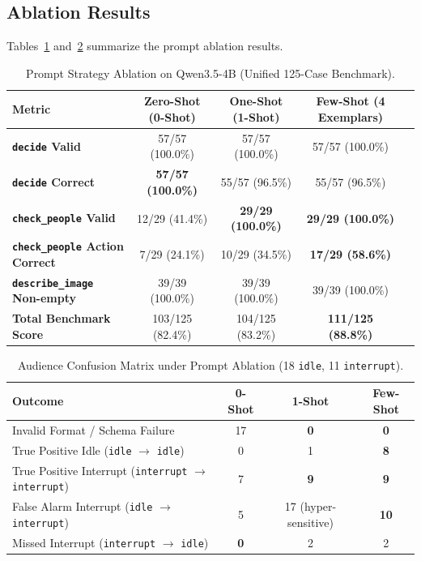 ﻿\documentclass[11pt,a4paper]{article}
\begin{document}
\subsection{Ablation Results}
Tables~\ref{tab:prompt_ablation} and~\ref{tab:ablation_confusion} summarize the prompt ablation results.

\begin{table}[htbp]
\centering
\small
\caption{Prompt Strategy Ablation on Qwen3.5-4B (Unified 125-Case Benchmark).}
\label{tab:prompt_ablation}
\begin{tabular*}{\textwidth}{@{\extracolsep{\fill}}lcccc@{}}
\toprule
\textbf{Metric} & \textbf{Zero-Shot (0-Shot)} & \textbf{One-Shot (1-Shot)} & \textbf{Few-Shot (4 Exemplars)} \\
\midrule
\textbf{\texttt{decide} Valid} & 57/57 (100.0\%) & 57/57 (100.0\%) & 57/57 (100.0\%) \\
\textbf{\texttt{decide} Correct} & \textbf{57/57 (100.0\%)} & 55/57 (96.5\%) & 55/57 (96.5\%) \\
\textbf{\texttt{check\_people} Valid} & 12/29 (41.4\%) & \textbf{29/29 (100.0\%)} & \textbf{29/29 (100.0\%)} \\
\textbf{\texttt{check\_people} Action Correct} & 7/29 (24.1\%) & 10/29 (34.5\%) & \textbf{17/29 (58.6\%)} \\
\textbf{\texttt{describe\_image} Non-empty} & 39/39 (100.0\%) & 39/39 (100.0\%) & 39/39 (100.0\%) \\
\midrule
\textbf{Total Benchmark Score} & 103/125 (82.4\%) & 104/125 (83.2\%) & \textbf{111/125 (88.8\%)} \\
\bottomrule
\end{tabular*}
\end{table}

\begin{table}[htbp]
\centering
\small
\caption{Audience Confusion Matrix under Prompt Ablation (18 \texttt{idle}, 11 \texttt{interrupt}).}
\label{tab:ablation_confusion}
\begin{tabular*}{\textwidth}{@{\extracolsep{\fill}}lccc@{}}
\toprule
\textbf{Outcome} & \textbf{0-Shot} & \textbf{1-Shot} & \textbf{Few-Shot} \\
\midrule
Invalid Format / Schema Failure & 17 & \textbf{0} & \textbf{0} \\
True Positive Idle (\texttt{idle} $\to$ \texttt{idle}) & 0 & 1 & \textbf{8} \\
True Positive Interrupt (\texttt{interrupt} $\to$ \texttt{interrupt}) & 7 & \textbf{9} & \textbf{9} \\
False Alarm Interrupt (\texttt{idle} $\to$ \texttt{interrupt}) & 5 & 17 (hyper-sensitive) & \textbf{10} \\
Missed Interrupt (\texttt{interrupt} $\to$ \texttt{idle}) & \textbf{0} & 2 & 2 \\
\bottomrule
\end{tabular*}
\end{table}
\end{document}
